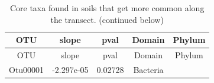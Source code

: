 \documentclass[]{article}
\begin{document}
\begin{longtable}[]{@{}ccccc@{}}
\caption{Core taxa found in soils that get more common along the
transect. (continued below)}\tabularnewline
\toprule
\begin{minipage}[b]{0.13\columnwidth}\centering\strut
OTU\strut
\end{minipage} & \begin{minipage}[b]{0.16\columnwidth}\centering\strut
slope\strut
\end{minipage} & \begin{minipage}[b]{0.14\columnwidth}\centering\strut
pval\strut
\end{minipage} & \begin{minipage}[b]{0.13\columnwidth}\centering\strut
Domain\strut
\end{minipage} & \begin{minipage}[b]{0.20\columnwidth}\centering\strut
Phylum\strut
\end{minipage}\tabularnewline
\midrule
\endfirsthead
\toprule
\begin{minipage}[b]{0.13\columnwidth}\centering\strut
OTU\strut
\end{minipage} & \begin{minipage}[b]{0.16\columnwidth}\centering\strut
slope\strut
\end{minipage} & \begin{minipage}[b]{0.14\columnwidth}\centering\strut
pval\strut
\end{minipage} & \begin{minipage}[b]{0.13\columnwidth}\centering\strut
Domain\strut
\end{minipage} & \begin{minipage}[b]{0.20\columnwidth}\centering\strut
Phylum\strut
\end{minipage}\tabularnewline
\midrule
\endhead
\begin{minipage}[t]{0.13\columnwidth}\centering\strut
Otu00001\strut
\end{minipage} & \begin{minipage}[t]{0.16\columnwidth}\centering\strut
-2.297e-05\strut
\end{minipage} & \begin{minipage}[t]{0.14\columnwidth}\centering\strut
0.02728\strut
\end{minipage} & \begin{minipage}[t]{0.13\columnwidth}\centering\strut
Bacteria\strut
\end{minipage} & \begin{minipage}[t]{0.20\columnwidth}\centering\strut

\end{minipage}
\end{longtable}
\end{document}
